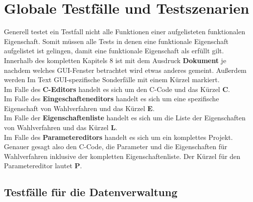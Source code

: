 \documentclass[a4paper]{scrreprt}
\begin{document}
\chapter{Globale Testfälle und Testszenarien}

Generell testet ein Testfall nicht alle Funktionen einer aufgelisteten funktionalen Eigenschaft. Somit müssen alle Tests in denen eine funktionale Eigenschaft aufgelistet ist gelingen, damit eine funktionale Eigenschaft als erfüllt gilt. \\
Innerhalb des kompletten Kapitels 8 ist mit dem Ausdruck \textbf{Dokument} je nachdem welches \ac{GUI}-Fenster betrachtet wird etwas anderes gemeint. Außerdem werden Im Text \ac{GUI}-spezifische Sonderfälle mit einem Kürzel markiert. \\
Im Falle des \textbf{C-Editors} handelt es sich um den C-Code und das Kürzel \textbf{C}. \\
Im Falle des \textbf{Eingeschafteneditors} handelt es sich um eine spezifische Eigenschaft von Wahlverfahren und das Kürzel \textbf{E}. \\
Im Falle der \textbf{Eigenschaftenliste} handelt es sich um die Liste der Eigenschaften von Wahlverfahren und das Kürzel \textbf{L}. \\
Im Falle des \textbf{Parametereditors} handelt es sich um ein komplettes Projekt. Genauer gesagt also den C-Code, die Parameter und die Eigenschaften für Wahlverfahren inklusive der kompletten Eigenschaftenliste. Der Kürzel für den Parametereditor lautet \textbf{P}. \\

\section{Testfälle für die Datenverwaltung}
\end{document}
